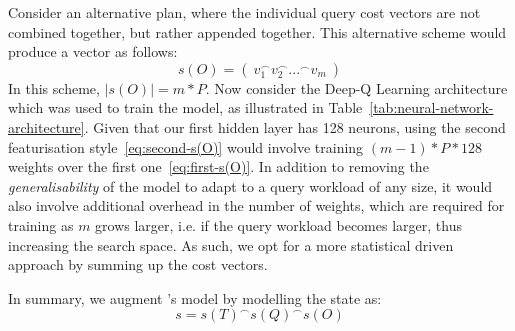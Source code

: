 Consider an alternative plan, where the individual query cost vectors are not combined together, but rather appended together. This alternative scheme would produce a vector as follows:
\begin{equation}
    s(O) = (\ v_1^\frown v_2^\frown ...^\frown v_m\ )
    \label{eq:second-s(O)}
\end{equation}
In this scheme, $|s(O)| = m*P$. Now consider the Deep-Q Learning architecture which was used to train the model, as illustrated in Table~\ref{tab:neural-network-architecture}. Given that our first hidden layer has 128 neurons, using the second featurisation style~\ref{eq:second-s(O)} would involve training $(m-1)*P*128$ weights over the first one~\ref{eq:first-s(O)}. In addition to removing the \textit{generalisability} of the model to adapt to a query workload of any size, it would also involve additional overhead in the number of weights, which are required for training as $m$ grows larger, i.e. if the query workload becomes larger, thus increasing the search space. As such, we opt for a more statistical driven approach by summing up the cost vectors.

In summary, we augment \citeauthor{Hilprecht:2019:TLP:3329859.3329876}'s model by modelling the state as:
\begin{equation}
    s = s(T)^\frown s(Q)^\frown s(O)
\end{equation}

